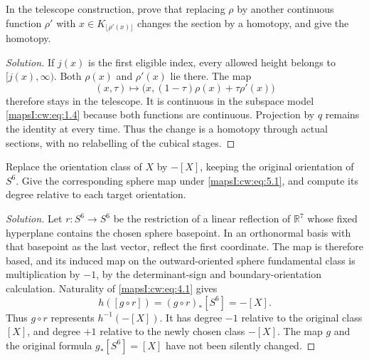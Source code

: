 \begin{example}
\label{mapsI:cw:exercise:5.1} In the telescope construction, prove that replacing \(\rho\) by another continuous function \(\rho'\) with \(x\in K_{\lfloor\rho'(x)\rfloor}\) changes the section by a homotopy, and give the homotopy.

\end{example}
\begin{proof}[Solution] If \(j(x)\) is the first eligible index, every allowed height belongs to \([j(x),\infty)\). Both \(\rho(x)\) and \(\rho'(x)\) lie there. The map
\begin{equation}
(x,\tau)\longmapsto
\bigl(x,(1-\tau)\rho(x)+\tau\rho'(x)\bigr)
\label{mapsI:cw:eq:5.2}
\end{equation}
therefore stays in the telescope. It is continuous in the subspace model \eqref{mapsI:cw:eq:1.4} because both functions are continuous. Projection by \(q\) remains the identity at every time. Thus the change is a homotopy through actual sections, with no relabelling of the cubical stages.
\end{proof}

\begin{example}
\label{mapsI:cw:exercise:5.2} Replace the orientation class of \(X\) by \(-[X]\), keeping the original orientation of \(S^6\). Give the corresponding sphere map under \eqref{mapsI:cw:eq:5.1}, and compute its degree relative to each target orientation.

\end{example}
\begin{proof}[Solution] Let \(r:S^6\to S^6\) be the restriction of a linear reflection of \(\mathbb R^7\) whose fixed hyperplane contains the chosen sphere basepoint. In an orthonormal basis with that basepoint as the last vector, reflect the first coordinate. The map is therefore based, and its induced map on the outward-oriented sphere fundamental class is multiplication by \(-1\), by the determinant-sign and boundary-orientation calculation. Naturality of \eqref{mapsI:cw:eq:4.1} gives
\begin{equation}
h([g\circ r])=(g\circ r)_*[S^6]=-[X].
\label{mapsI:cw:eq:5.3}
\end{equation}
Thus \(g\circ r\) represents \(h^{-1}(-[X])\). It has degree \(-1\) relative to the original class \([X]\), and degree \(+1\) relative to the newly chosen class \(-[X]\). The map \(g\) and the original formula \(g_*[S^6]=[X]\) have not been silently changed.
\end{proof}

